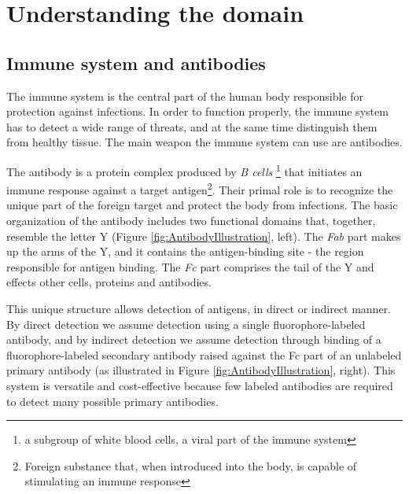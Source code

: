 
\chapter{Understanding the domain} 

\label{Chapter2} %




\section{Immune system and antibodies }

The immune system is the central part of the human body responsible for protection against infections. In order to function properly, the immune system has to detect a wide range of threats, and at the same time distinguish them from  healthy tissue. The main weapon the immune system can use are antibodies.   

The antibody is a protein complex produced by \textit{B cells} \footnote{ a subgroup of white blood cells, a viral part of the immune system} that initiates an immune response against a target antigen\footnote{Foreign substance that, when introduced into the body, is capable of stimulating an immune response}. Their primal role is to recognize the unique part of the foreign target and  protect the body from infections. The basic organization of the antibody includes two functional domains that, together, resemble the letter Y (Figure \ref{fig:AntibodyIllustration}, left). The \textit{Fab}  part makes up the arms of the Y, and it contains the antigen-binding site - the region responsible for antigen binding. The \textit{Fc} part comprises the tail of the Y and effects other cells, proteins and antibodies.  

This unique structure allows detection of antigens, in direct or indirect manner. By direct detection we assume detection using a single fluorophore-labeled antibody, and by indirect detection we assume detection through binding of a fluorophore-labeled secondary antibody raised against the Fc part of an unlabeled primary antibody (as illustrated in Figure \ref{fig:AntibodyIllustration}, right). This system is versatile and cost-effective because few labeled antibodies are required to detect many possible primary antibodies.


